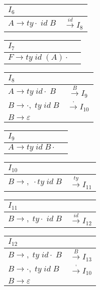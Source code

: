 \documentclass[11pt]{article}
\begin{document}
\begin{multicols}{2}
\begin{table}[H]
\centering
\begin{tabular}{l c}
$I_{6}$ & \\
\hline
$A \rightarrow ty \cdot \; id \; B$ & $\xrightarrow{id} I_{8}$    
\end{tabular}
\end{table}

\begin{table}[H]
\centering
\begin{tabular}{l c}
$I_{7}$ & \\
\hline
$F \rightarrow ty \; id \; \left( A\right) \cdot$ &     
\end{tabular}
\end{table}

\begin{table}[H]
\centering
\begin{tabular}{l c}
$I_{8}$ & \\
\hline
$A \rightarrow ty \; id \cdot \; B$ & $\xrightarrow{B} I_{9}$ \\
$B \rightarrow \cdot , \; ty \; id \; B$ & $\xrightarrow{,} I_{10}$ \\
$B \rightarrow \varepsilon$ & 
\end{tabular}
\end{table}

\begin{table}[H]
\centering
\begin{tabular}{l c}
$I_{9}$ & \\
\hline
$A \rightarrow ty \; id \; B \cdot$ &     
\end{tabular}
\end{table}

\begin{table}[H]
\centering
\begin{tabular}{l c}
$I_{10}$ & \\
\hline
$B \rightarrow , \; \cdot ty \; id \; B$ & $\xrightarrow{ty} I_{11}$    
\end{tabular}
\end{table}

\begin{table}[H]
\centering
\begin{tabular}{l c}
$I_{11}$ & \\
\hline
$B \rightarrow , \; ty \cdot \; id \; B$ & $\xrightarrow{id} I_{12}$    
\end{tabular}
\end{table}

\begin{table}[H]
\centering
\begin{tabular}{l c}
$I_{12}$ & \\
\hline
$B \rightarrow , \; ty \; id \cdot \; B$ & $\xrightarrow{B} I_{13}$ \\
$B \rightarrow \cdot , \; ty \; id \; B$ & $\xrightarrow{,} I_{10}$ \\
$B \rightarrow \varepsilon$ &    
\end{tabular}
\end{table}


\end{multicols}
\end{document}
